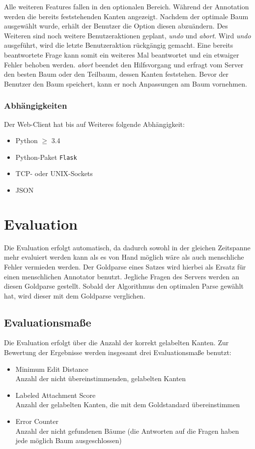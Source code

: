 \documentclass{scrartcl}
\begin{document}
Alle weiteren Features fallen in den optionalen Bereich.
Während der Annotation werden die bereits feststehenden Kanten angezeigt.
Nachdem der optimale Baum ausgewählt wurde, erhält der Benutzer die Option diesen abzuändern.
Des Weiteren sind noch weitere Benutzeraktionen geplant, \textit{undo} und \textit{abort}.
Wird \textit{undo} ausgeführt, wird die letzte Benutzeraktion rückgängig gemacht.
Eine bereits beantwortete Frage kann somit ein weiteres Mal beantwortet und ein etwaiger Fehler behoben werden.
\textit{abort} beendet den Hilfsvorgang und erfragt vom Server den besten Baum oder den Teilbaum, dessen Kanten feststehen.
Bevor der Benutzer den Baum speichert, kann er noch Anpassungen am Baum vornehmen.

\subsubsection{Abhängigkeiten}
\label{ssub:Web-Client-Abhaengigkeiten}
Der Web-Client hat bis auf Weiteres folgende Abhängigkeit:
\begin{itemize}
    \item Python $\geq$ 3.4 
    \item Python-Paket \texttt{Flask}
    \item TCP- oder UNIX-Sockets
    \item JSON
\end{itemize}

\section{Evaluation}
Die Evaluation erfolgt automatisch, da dadurch sowohl in der gleichen Zeitspanne mehr evaluiert werden kann als es von Hand möglich wäre als auch menschliche Fehler vermieden werden.
Der Goldparse eines Satzes wird hierbei als Ersatz für einen menschlichen Annotator benutzt. Jegliche Fragen des Servers werden an diesen Goldparse gestellt. Sobald der Algorithmus den optimalen Parse gewählt hat, wird dieser mit dem Goldparse verglichen.

\subsection{Evaluationsmaße}

Die Evaluation erfolgt über die Anzahl der korrekt gelabelten Kanten.
Zur Bewertung der Ergebnisse werden insgesamt drei Evaluationsmaße benutzt:
\begin{itemize}
\item Minimum Edit Distance\\
Anzahl der nicht übereinstimmenden, gelabelten Kanten
\item Labeled Attachment Score\\
Anzahl der gelabelten Kanten, die mit dem Goldstandard übereinstimmen
\item Error Counter\\
Anzahl der nicht gefundenen Bäume (die Antworten auf die Fragen haben jede möglich Baum ausgeschlossen)
\end{itemize}
\end{document}
